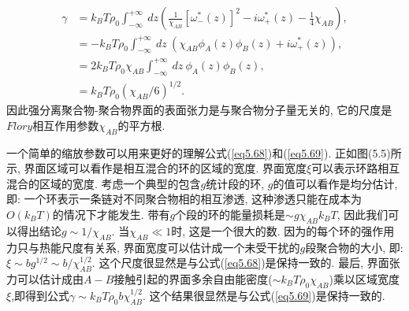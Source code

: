\label{subsec.equations}
    \begin{equation}
        \begin{aligned}
            \gamma&=k_{B}T\rho_{0}\int^{+\infty}_{-\infty}\ dz\left(
            \frac{1}{\chi_{AB}}[\omega^{*}_{-}(z)]^{2}-i\omega^{*}_{+}(z)-\frac{1}{4}\chi_{AB}\right),
            \\
            &=-k_{B}T\rho_{0}\int^{+\infty}_{-\infty}\ dz\ (
            \chi_{AB}\phi_{A}(z)\phi_{B}(z)+i\omega^{*}_{+}(z)),
            \\
            &=2k_{B}T\rho_{0}\chi_{AB}\int^{+\infty}_{-\infty}\ dz\
            \phi_{A}(z)\phi_{B}(z),
            \\
            &=k_{B}T\rho_{0}(\chi_{AB}/6)^{1/2}.
        \end{aligned}
        \label{eq5.69}
    \end{equation}
因此强分离聚合物-聚合物界面的表面张力是与聚合物分子量无关的,
它的尺度是$Flory$相互作用参数$\chi_{AB}$的平方根.
\par
一个简单的缩放参数可以用来更好的理解公式(\ref{eq5.68})和(\ref{eq5.69}).
正如图(5.5)所示, 界面区域可以看作是相互混合的环的区域的宽度.
界面宽度$\xi$可以表示环路相互混合的区域的宽度.
考虑一个典型的包含$g$统计段的环, $g$的值可以看作是均分估计, 即:
一个环表示一条链对不同聚合物相的相互渗透,
这种渗透只能在成本为$O(k_{B}T)$的情况下才能发生.
带有$g$个段的环的能量损耗是$\sim g\chi_{AB}k_{B}T$, 因此我们可以得出结论$g\sim
1/\chi_{AB}$. 当$\chi_{AB}\ll 1$时, 这是一个很大的数.
因为的每个环的强作用力只与热能尺度有关系,
界面宽度可以估计成一个未受干扰的$g$段聚合物的大小, 即: $\xi\sim bg^{1/2}\sim
b/\chi_{AB}^{1/2}$. 这个尺度很显然是与公式(\ref{eq5.68})是保持一致的. 最后,
界面张力可以估计成由$A-B$接触引起的界面多余自由能密度($\sim
k_{B}T\rho_{0}\chi_{AB}$)乘以区域宽度$\xi$,即得到公式$\gamma\sim
k_{B}T\rho_{0}b\chi_{AB}^{1/2}$.
这个结果很显然是与公式(\ref{eq5.69})是保持一致的.


